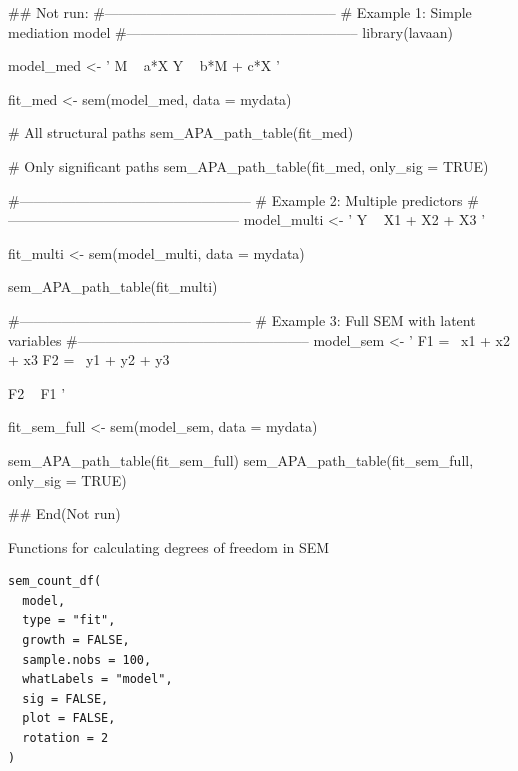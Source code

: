 \documentclass[a4paper]{book}
\begin{document}
\begin{Examples}
\begin{ExampleCode}
\#\# Not run: 
#--------------------------------------------------
# Example 1: Simple mediation model
#--------------------------------------------------
library(lavaan)

model_med <- '
  M ~ a*X
  Y ~ b*M + c*X
'

fit_med <- sem(model_med, data = mydata)

# All structural paths
sem_APA_path_table(fit_med)

# Only significant paths
sem_APA_path_table(fit_med, only_sig = TRUE)

#--------------------------------------------------
# Example 2: Multiple predictors
#--------------------------------------------------
model_multi <- '
  Y ~ X1 + X2 + X3
'

fit_multi <- sem(model_multi, data = mydata)

sem_APA_path_table(fit_multi)

#--------------------------------------------------
# Example 3: Full SEM with latent variables
#--------------------------------------------------
model_sem <- '
  F1 =~ x1 + x2 + x3
  F2 =~ y1 + y2 + y3

  F2 ~ F1
'

fit_sem_full <- sem(model_sem, data = mydata)

sem_APA_path_table(fit_sem_full)
sem_APA_path_table(fit_sem_full, only_sig = TRUE)

## End(Not run)
\end{ExampleCode}
\end{Examples}
%
\begin{Description}
Functions for calculating degrees of freedom in SEM
\end{Description}
%
\begin{Usage}
\begin{verbatim}
sem_count_df(
  model,
  type = "fit",
  growth = FALSE,
  sample.nobs = 100,
  whatLabels = "model",
  sig = FALSE,
  plot = FALSE,
  rotation = 2
)
\end{verbatim}
\end{Usage}
%
\end{document}
